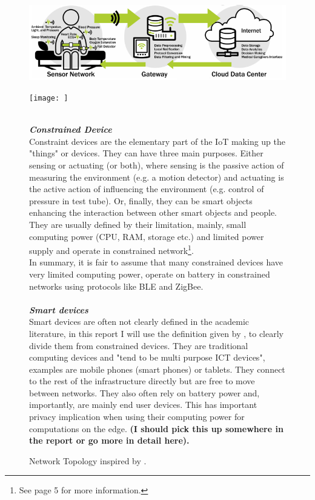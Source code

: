 \begin{figure}[h!]
    \centering
    \includegraphics[scale=1.8]{figures/iotSetup.png}
    \caption{Network Topology inspired by \cite{iotGatewaySlavesGraph}.}
    \label{fig:netowrkTopology}
\texttt{[image: ]}

\vspace{0.5mm}\\
\textbf{\textit{Constrained Device}}\\
Constraint devices are the elementary part of the IoT 
making up the "things" or devices\cite{contstraintDevicesTerminology}.
They can have three main purposes.
Either sensing or actuating (or both), where sensing is the 
passive action of measuring the environment (e.g. a motion detector) and actuating is the active action of influencing the environment (e.g. control of pressure in test tube). Or, finally, they can be smart objects enhancing the interaction between other smart objects and people.\\
They are usually defined by their limitation, mainly, small computing power (CPU, RAM, storage etc.) and limited power supply and operate in constrained network\footnote{See \cite{contstraintDevicesTerminology} page 5 for more information.}.\\
In summary, it is fair to assume that many constrained devices have very limited computing power, operate on battery in constrained networks using protocols like BLE and ZigBee. \\

\vspace{0.5mm}\\
\textbf{\textit{Smart devices}}\\
Smart devices are often not clearly defined in the academic literature, in this report I will use the definition given by \citeauthor{poslad2011smartDevices}\cite{poslad2011smartDevices}, to clearly divide them from constrained devices. They are traditional computing devices and "tend to be multi purpose ICT devices"\cite{poslad2011smartDevices}, examples are mobile phones (smart phones) or tablets. They connect to the rest of the infrastructure directly but are free to move between networks. They also often rely on battery power and, importantly, are mainly end user devices. This has important privacy implication when using their computing power for computations on the edge. \textbf{(I should pick this up somewhere in the report or go more in detail here).}\\


\end{figure}

